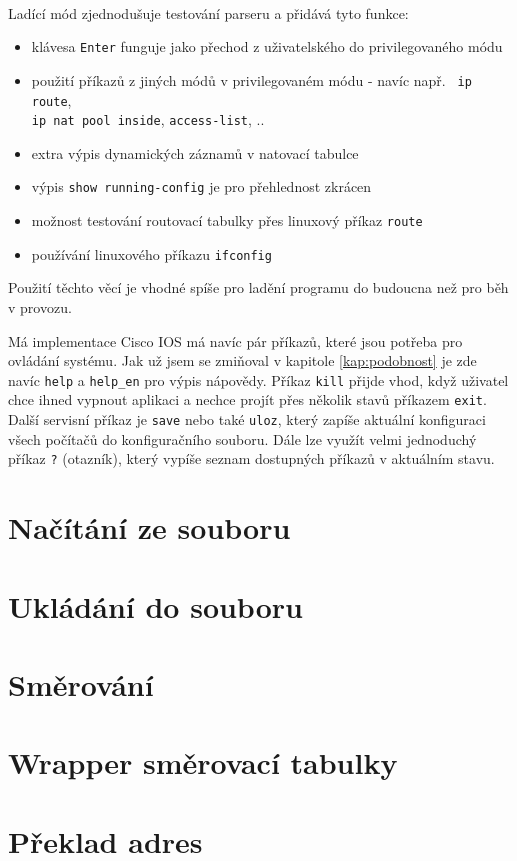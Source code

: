 \paragraph{}
Ladící mód zjednodušuje testování parseru a přidává tyto funkce:
\begin{itemize}
 \item klávesa \verb|Enter| funguje jako přechod z uživatelského do privilegovaného módu
 \item použití příkazů z jiných módů v privilegovaném módu - navíc např. \verb| ip route|, \\\verb|ip nat pool inside|, \verb|access-list|, ..
 \item extra výpis dynamických záznamů v natovací tabulce
 \item výpis \verb|show running-config| je pro přehlednost zkrácen
 \item možnost testování routovací tabulky přes linuxový příkaz \verb|route|
 \item používání linuxového příkazu \verb|ifconfig|
\end{itemize}
Použití těchto věcí je vhodné spíše pro ladění programu do budoucna než pro běh v  provozu.

Má implementace Cisco IOS má navíc pár příkazů, které jsou potřeba pro ovládání systému. Jak už jsem se zmiňoval v kapitole \ref{kap:podobnost} je zde navíc \verb|help| a \verb|help_en| pro výpis nápovědy. Příkaz \verb|kill| přijde vhod, když uživatel chce ihned vypnout aplikaci a nechce projít přes několik stavů příkazem \verb|exit|. Další servisní příkaz je \verb|save| nebo také \verb|uloz|, který zapíše aktuální konfiguraci všech počítačů do konfiguračního souboru. Dále lze využít velmi jednoduchý příkaz \verb|?| (otazník), který vypíše seznam dostupných příkazů v aktuálním stavu.


\section{Načítání ze souboru}

\section{Ukládání do souboru}

\section{Směrování}\label{prijmiEthernetove}

\section{Wrapper směrovací tabulky}

\section{Překlad adres}


